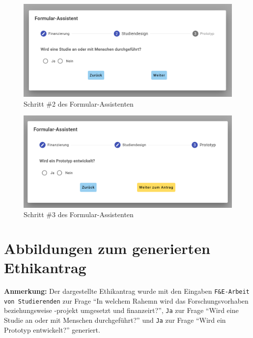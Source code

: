 \documentclass[a4paper,12pt,twoside]{scrreprt}
\begin{document}
\begin{figure}[ht]
    \centering
    \includegraphics[width=.85\linewidth]{thesis/images/Luidold_EthicsVision-Formular-Assistent_Studiendesign.png}
    \caption{Schritt \#2 des Formular-Assistenten}
    \label{fig:ethics-vision-formular-assistent-studiendesign}
\end{figure}

\begin{figure}[ht]
    \centering
    \includegraphics[width=.85\linewidth]{thesis/images/Luidold_EthicsVision-Formular-Assistent_Prototyp.png}
    \caption{Schritt \#3 des Formular-Assistenten}
    \label{fig:ethics-vision-formular-assistent-prototyp}
\end{figure}

\section{Abbildungen zum generierten Ethikantrag}
\label{appendix:ethics-vision-formular}

\textbf{Anmerkung:} Der dargestellte Ethikantrag wurde mit den Eingaben \texttt{F\&E-Arbeit von Studierenden} zur Frage \enquote{In welchem Rahemn wird das Forschungsvorhaben beziehungsweise -projekt umgesetzt und finanzeirt?}, \texttt{Ja} zur Frage \enquote{Wird eine Studie an oder mit Menschen durchgeführt?} und \texttt{Ja} zur Frage \enquote{Wird ein Prototyp entwickelt?} generiert.
\end{document}
